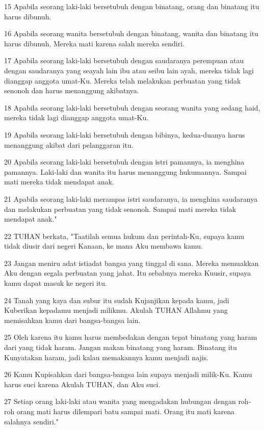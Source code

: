 \par 15 Apabila seorang laki-laki bersetubuh dengan binatang, orang dan binatang itu harus dibunuh.
\par 16 Apabila seorang wanita bersetubuh dengan binatang, wanita dan binatang itu harus dibunuh. Mereka mati karena salah mereka sendiri.
\par 17 Apabila seorang laki-laki bersetubuh dengan saudaranya perempuan atau dengan saudaranya yang seayah lain ibu atau seibu lain ayah, mereka tidak lagi dianggap anggota umat-Ku. Mereka telah melakukan perbuatan yang tidak senonoh dan harus menanggung akibatnya.
\par 18 Apabila seorang laki-laki bersetubuh dengan seorang wanita yang sedang haid, mereka tidak lagi dianggap anggota umat-Ku.
\par 19 Apabila seorang laki-laki bersetubuh dengan bibinya, kedua-duanya harus menanggung akibat dari pelanggaran itu.
\par 20 Apabila seorang laki-laki bersetubuh dengan istri pamannya, ia menghina pamannya. Laki-laki dan wanita itu harus menanggung hukumannya. Sampai mati mereka tidak mendapat anak.
\par 21 Apabila seorang laki-laki merampas istri saudaranya, ia menghina saudaranya dan melakukan perbuatan yang tidak senonoh. Sampai mati mereka tidak mendapat anak."
\par 22 TUHAN berkata, "Taatilah semua hukum dan perintah-Ku, supaya kamu tidak diusir dari negeri Kanaan, ke mana Aku membawa kamu.
\par 23 Jangan meniru adat istiadat bangsa yang tinggal di sana. Mereka memuakkan Aku dengan segala perbuatan yang jahat. Itu sebabnya mereka Kuusir, supaya kamu dapat masuk ke negeri itu.
\par 24 Tanah yang kaya dan subur itu sudah Kujanjikan kepada kamu, jadi Kuberikan kepadamu menjadi milikmu. Akulah TUHAN Allahmu yang memisahkan kamu dari bangsa-bangsa lain.
\par 25 Oleh karena itu kamu harus membedakan dengan tepat binatang yang haram dari yang tidak haram. Jangan makan binatang yang haram. Binatang itu Kunyatakan haram, jadi kalau memakannya kamu menjadi najis.
\par 26 Kamu Kupisahkan dari bangsa-bangsa lain supaya menjadi milik-Ku. Kamu harus suci karena Akulah TUHAN, dan Aku suci.
\par 27 Setiap orang laki-laki atau wanita yang mengadakan hubungan dengan roh-roh orang mati harus dilempari batu sampai mati. Orang itu mati karena salahnya sendiri."

